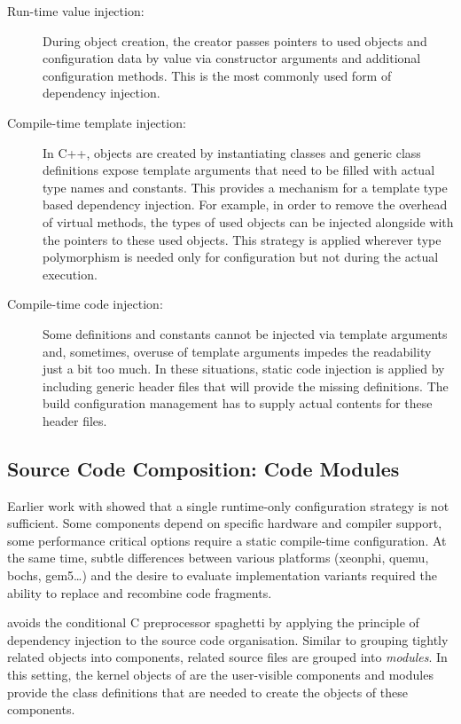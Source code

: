 \begin{description}
\item[Run-time value injection:]
During object creation, the creator passes pointers to used objects and configuration data by value via constructor arguments and additional configuration methods. This is the most commonly used form of dependency injection.

\item[Compile-time template injection:]
In C++, objects are created by instantiating classes and generic class definitions expose template arguments that need to be filled with actual type names and constants. This provides a mechanism for a template type based dependency injection. For example, in order to remove the overhead of virtual methods, the types of used objects can be injected alongside with the pointers to these used objects. This strategy is applied wherever type polymorphism is needed only for configuration but not during the actual execution. 

\item[Compile-time code injection:]
Some definitions and constants cannot be injected via template arguments and, sometimes, overuse of template arguments impedes the readability just a bit too much. In these situations, static code injection is applied by including generic header files that will provide the missing definitions. The build configuration management has to supply actual contents for these header files.
\end{description}


\subsection{Source Code Composition: Code Modules}
\label{sec:code-modules-impl}

Earlier work with \mythos showed that a single runtime-only configuration strategy is not sufficient. Some components depend on specific hardware and compiler support, some performance critical options require a static compile-time configuration. At the same time, subtle differences between various platforms (xeonphi, quemu, bochs, gem5\ldots) and the desire to evaluate implementation variants required the ability to replace and recombine code fragments.

\mythos avoids the conditional C preprocessor spaghetti by applying the principle of dependency injection to the source code organisation. Similar to grouping tightly related objects into components, related source files are grouped into \emph{modules}. In this setting, the kernel objects of \mythos are the user-visible components and modules provide the class definitions that are needed to create the objects of these components. 

